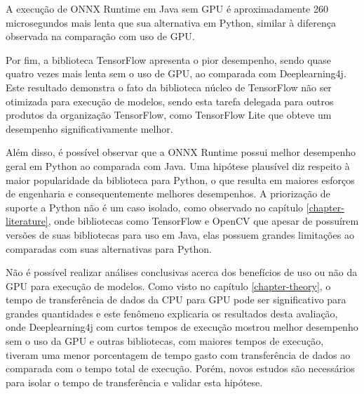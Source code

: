 A execução de ONNX Runtime em Java sem GPU é aproximadamente 260 microsegundos mais lenta que sua alternativa em Python, similar à diferença observada na comparação com uso de GPU.

Por fim, a biblioteca TensorFlow apresenta o pior desempenho, sendo quase quatro vezes mais lenta sem o uso de GPU, ao comparada com Deeplearning4j. Este resultado demonstra o fato da biblioteca núcleo de TensorFlow não ser otimizada para execução de modelos, sendo esta tarefa delegada para outros produtos da organização TensorFlow, como TensorFlow Lite que obteve um desempenho significativamente melhor.

Além disso, é possível observar que a ONNX Runtime possui melhor desempenho geral em Python ao comparada com Java. Uma hipótese plausível diz respeito à maior popularidade da biblioteca para Python, o que resulta em maiores esforços de engenharia e consequentemente melhores desempenhos. A priorização de suporte a Python não é um caso isolado, como observado no capítulo \ref{chapter-literature}, onde bibliotecas como TensorFlow e OpenCV que apesar de possuírem versões de suas bibliotecas para uso em Java, elas possuem grandes limitações ao comparadas com suas alternativas para Python.

Não é possível realizar análises conclusivas acerca dos benefícios de uso ou não da GPU para execução de modelos. Como visto no capítulo \ref{chapter-theory}, o tempo de transferência de dados da CPU para GPU pode ser significativo para grandes quantidades e este fenômeno explicaria os resultados desta avaliação, onde Deeplearning4j com curtos tempos de execução mostrou melhor desempenho sem o uso da GPU e outras bibliotecas, com maiores tempos de execução, tiveram uma menor porcentagem de tempo gasto com transferência de dados ao comparada com o tempo total de execução. Porém, novos estudos são necessários para isolar o tempo de transferência e validar esta hipótese.